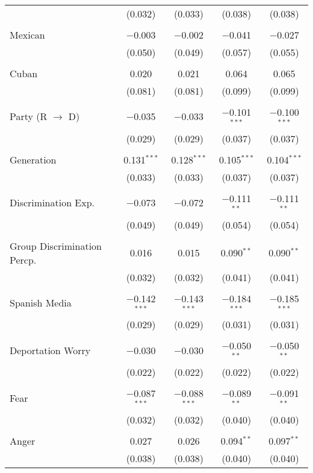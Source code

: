\begin{table}[!htbp]
\begin{tabular}{@{\extracolsep{5pt}}lcccc}
  & (0.032) & (0.033) & (0.038) & (0.038) \\ 
  & & & & \\ 
 Mexican & $-$0.003 & $-$0.002 & $-$0.041 & $-$0.027 \\ 
  & (0.050) & (0.049) & (0.057) & (0.055) \\ 
  & & & & \\ 
 Cuban & 0.020 & 0.021 & 0.064 & 0.065 \\ 
  & (0.081) & (0.081) & (0.099) & (0.099) \\ 
  & & & & \\ 
 Party (R $\longrightarrow$ D) & $-$0.035 & $-$0.033 & $-$0.101$^{***}$ & $-$0.100$^{***}$ \\ 
  & (0.029) & (0.029) & (0.037) & (0.037) \\ 
  & & & & \\ 
 Generation & 0.131$^{***}$ & 0.128$^{***}$ & 0.105$^{***}$ & 0.104$^{***}$ \\ 
  & (0.033) & (0.033) & (0.037) & (0.037) \\ 
  & & & & \\ 
 Discrimination Exp. & $-$0.073 & $-$0.072 & $-$0.111$^{**}$ & $-$0.111$^{**}$ \\ 
  & (0.049) & (0.049) & (0.054) & (0.054) \\ 
  & & & & \\ 
 Group Discrimination Percp. & 0.016 & 0.015 & 0.090$^{**}$ & 0.090$^{**}$ \\ 
  & (0.032) & (0.032) & (0.041) & (0.041) \\ 
  & & & & \\ 
 Spanish Media & $-$0.142$^{***}$ & $-$0.143$^{***}$ & $-$0.184$^{***}$ & $-$0.185$^{***}$ \\ 
  & (0.029) & (0.029) & (0.031) & (0.031) \\ 
  & & & & \\ 
 Deportation Worry & $-$0.030 & $-$0.030 & $-$0.050$^{**}$ & $-$0.050$^{**}$ \\ 
  & (0.022) & (0.022) & (0.022) & (0.022) \\ 
  & & & & \\ 
 Fear & $-$0.087$^{***}$ & $-$0.088$^{***}$ & $-$0.089$^{**}$ & $-$0.091$^{**}$ \\ 
  & (0.032) & (0.032) & (0.040) & (0.040) \\ 
  & & & & \\ 
 Anger & 0.027 & 0.026 & 0.094$^{**}$ & 0.097$^{**}$ \\ 
  & (0.038) & (0.038) & (0.040) & (0.040) \\ 

\end{tabular}
\end{table}
